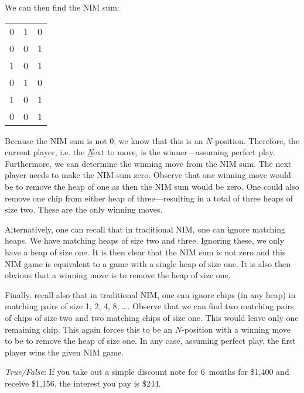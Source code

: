 \documentclass[11pt,letterpaper]{article}
\begin{document}
\newpage



We can then find the NIM sum: \par
	\begin{table}[h]
	\centering
	\begin{tabular}{rrr}
	0 & 1 & 0 \\
	0 & 0 & 1 \\
	1 & 0 & 1 \\
	0 & 1 & 0 \\
	1 & 0 & 1 \\ \hline
	0 & 0 & 1
	\end{tabular}
	\end{table} \par
Because the NIM sum is not 0, we know that this is an $N$-position. Therefore, the current player, i.e. the \textit{\underline{N}}ext to move, is the winner---assuming perfect play. Furthermore, we can determine the winning move from the NIM sum. The next player needs to make the NIM sum zero. Observe that one winning move would be to remove the heap of one as then the NIM sum would be zero. One could also remove one chip from either heap of three---resulting in a total of three heaps of size two. These are the only winning moves. \pspace

Alternatively, one can recall that in traditional NIM, one can ignore matching heaps. We have matching heaps of size two and three. Ignoring these, we only have a heap of size one. It is then clear that the NIM sum is not zero and this NIM game is equivalent to a game with a single heap of size one. It is also then obvious that a winning move is to remove the heap of size one. \pspace

Finally, recall also that in traditional NIM, one can ignore chips (in any heap) in matching pairs of size 1, 2, 4, 8, \dots. Observe that we can find two matching pairs of chips of size two and two matching chips of size one. This would leave only one remaining chip. This again forces this to be an $N$-position with a winning move to be to remove the heap of size one. In any case, assuming perfect play, the first player wins the given NIM game. \pvspace{1.3cm}



\quizsol \textit{True/False}: If you take out a simple discount note for 6~months for \$1,400 and receive \$1,156, the interest you pay is \$244. \pspace
\end{document}
